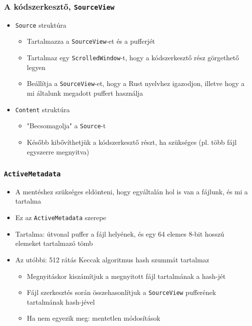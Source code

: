 \documentclass{beamer}
\begin{document}
    \begin{frame}[fragile]
        \frametitle{A kódszerkesztő, \texttt{SourceView}}

        \begin{itemize}
            \item \texttt{Source} struktúra \begin{itemize}
                \item Tartalmazza a \texttt{SourceView}-et és a pufferjét
                \item Tartalmaz egy \texttt{ScrolledWindow}-t, hogy a kódszerkesztő rész görgethető legyen
                \item Beállítja a \texttt{SourceView}-et, hogy a Rust nyelvhez igazodjon, illetve hogy a mi általunk megadott puffert használja 
            \end{itemize}
            \item \texttt{Content} struktúra \begin{itemize}
                \item "Becsomagolja" a \texttt{Source}-t
                \item Később kibővíthetjük a kódszerkesztő részt, ha szükséges (pl. több fájl egyszerre megnyitva)
            \end{itemize}
        \end{itemize}
    \end{frame}

    \begin{frame}[fragile]
        \frametitle{\texttt{ActiveMetadata}}

        \begin{itemize}
            \item A mentéshez szükséges eldönteni, hogy egyáltalán hol is van a fájlunk, és mi a tartalma
            \item Ez az \texttt{ActiveMetadata} szerepe
            \item Tartalma: útvonal puffer a fájl helyének, és egy 64 elemes 8-bit hosszú elemeket tartalmazó tömb
            \item Az utóbbi: 512 rátás Keccak algoritmus hash szummát tartalmaz \begin{itemize}
                \item Megnyitáskor kiszámítjuk a megnyitott fájl tartalmának a hash-jét
                \item Fájl szerkesztés során összehasonlítjuk a \texttt{SourceView} pufferének tartalmának hash-jével
                \item Ha nem egyezik meg: mentetlen módosítások
            \end{itemize}
        \end{itemize}
    \end{frame}
\end{document}
